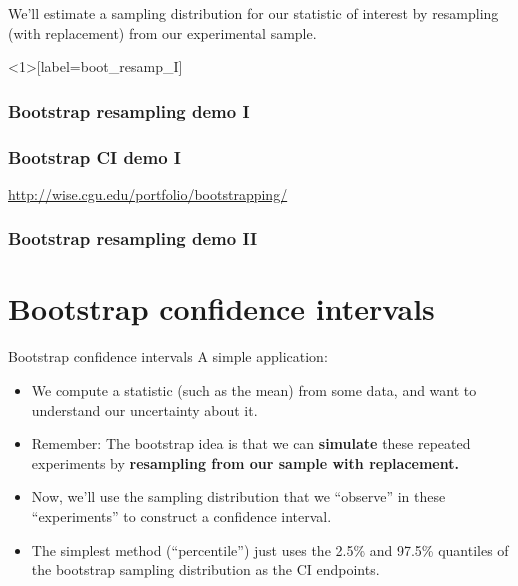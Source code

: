 \documentclass{beamer} %
\begin{document}
\begin{frame}[standout]
We'll estimate a sampling distribution for our statistic of interest by resampling (with replacement) from our experimental sample.
\end{frame}

\begin{frame}<1>[label=boot_resamp_I]
\frametitle<1>{Bootstrap resampling demo I}
\frametitle<2>{Bootstrap CI demo I}
\centering
\url{http://wise.cgu.edu/portfolio/bootstrapping/}
\end{frame}

\begin{frame}[label=boot_resamp_II]
\frametitle{Bootstrap resampling demo II}
\begin{figure}
\centering
{}
\end{figure}
\end{frame}

\section{Bootstrap confidence intervals}

\begin{frame}{Bootstrap confidence intervals}
A simple application:
\begin{itemize}[<+(1)->] \itemsep 1em
\item We compute a statistic (such as the mean) from some data, and want to understand our uncertainty about it.
\item Remember: The bootstrap idea is that we can \textbf{simulate} these repeated experiments by \textbf{resampling from our sample with replacement.}
\item Now, we'll use the sampling distribution that we ``observe'' in these ``experiments'' to construct a confidence interval.
\item The simplest method (``percentile'') just uses the 2.5\% and 97.5\% quantiles of the bootstrap sampling distribution as the CI endpoints.
\end{itemize}
\end{frame}
\end{document}
